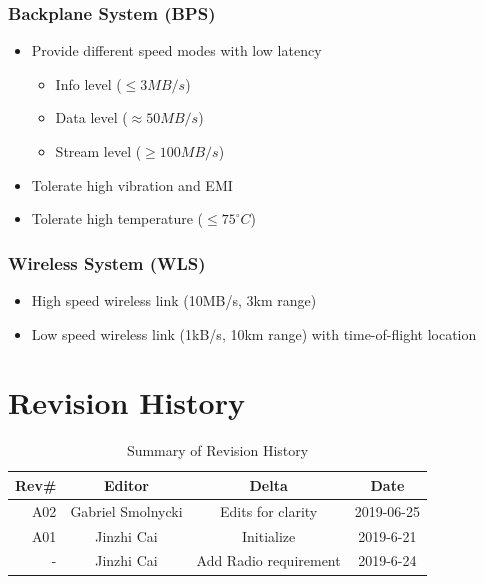\documentclass[12pt,article]{memoir}
\begin{document}
\subsection{Backplane System (BPS)}
\begin{itemize}
\item Provide different speed modes with low latency
\begin{itemize}
\item Info level ($\leq 3MB/s$)
\item Data level ($\approx 50MB/s$)
\item Stream level ($\geq 100MB/s$)
\end{itemize}
\item Tolerate high vibration and EMI
\item Tolerate high temperature ($\leq 75^{\circ}C$)
\end{itemize}
\subsection{Wireless System (WLS)}
\begin{itemize}
\item High speed wireless link (10MB/s, 3km range)
\item Low speed wireless link (1kB/s, 10km range) with time-of-flight location
\end{itemize}
\chapter{Revision History}
\begin{table}[H]
	\centering
	\begin{tabu}{r || c | c | c }
		Rev\# & Editor & Delta & Date\\ \hline
		A02 & Gabriel Smolnycki & Edits for clarity & 2019-06-25\\
		A01 & Jinzhi Cai & Initialize  & 2019-6-21 \\
		-	& Jinzhi Cai & Add Radio requirement & 2019-6-24
	\end{tabu}
	\caption{Summary of Revision History}
	\label{tab:edatools}
\end{table}

\end{document}
